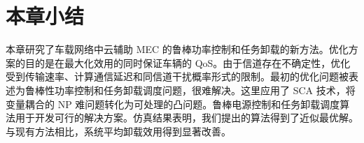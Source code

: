 \section{本章小结}\label{section3-5}
本章研究了车载网络中云辅助 MEC 的鲁棒功率控制和任务卸载的新方法。优化方案的目的是在最大化效用的同时保证车辆的 QoS。由于信道存在不确定性，优化受到传输速率、计算通信延迟和同信道干扰概率形式的限制。最初的优化问题被表述为鲁棒性功率控制和任务卸载调度问题，很难解决。这里应用了 SCA 技术，将变量耦合的 NP 难问题转化为可处理的凸问题。鲁棒电源控制和任务卸载调度算法用于开发可行的解决方案。仿真结果表明，我们提出的算法得到了近似最优解。与现有方法相比，系统平均卸载效用得到显著改善。

%
